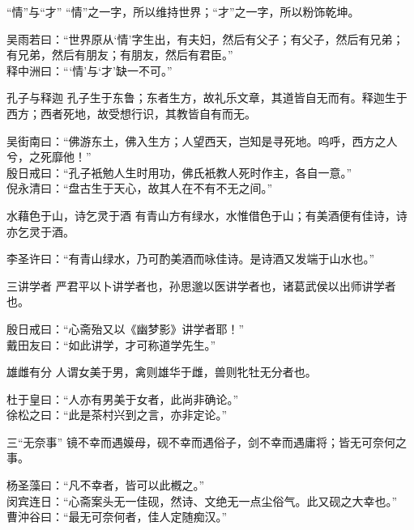 \begin{yulu}{“情”与“才”}
“情”之一字，所以维持世界；“才”之一字，所以粉饰乾坤。
\begin{comments}
吴雨若曰：“世界原从‘情’字生出，有夫妇，然后有父子；有父子，然后有兄弟；有兄弟，然后有朋友；有朋友，然后有君臣。” \\
释中洲曰：“‘情’与‘才’缺一不可。”
\end{comments}
\end{yulu}

\begin{yulu}{孔子与释迦}
孔子生于东鲁；东者生方，故礼乐文章，其道皆自无而有。释迦生于西方；西者死地，故受想行识，其教皆自有而无。
\begin{comments}
吴街南曰：“佛游东土，佛入生方；人望西天，岂知是寻死地。呜呼，西方之人兮，之死靡他！” \\
殷日戒曰：“孔子衹勉人生时用功，佛氏衹教人死时作主，各自一意。” \\
倪永清曰：“盘古生于天心，故其人在不有不无之间。”
\end{comments}
\end{yulu}

\begin{yulu}{水藉色于山，诗乞灵于酒}
有青山方有绿水，水惟借色于山；有美酒便有佳诗，诗亦乞灵于酒。
\begin{comments}
李圣许曰：“有青山绿水，乃可酌美酒而咏佳诗。是诗酒又发端于山水也。”
\end{comments}
\end{yulu}

\begin{yulu}{三讲学者}
严君平以卜讲学者也，孙思邈以医讲学者也，诸葛武侯以出师讲学者也。
\begin{comments}
殷日戒曰：“心斋殆又以《幽梦影》讲学者耶！” \\
戴田友曰：“如此讲学，才可称道学先生。”
\end{comments}
\end{yulu}

\begin{yulu}{雄雌有分}
人谓女美于男，禽则雄华于雌，兽则牝牡无分者也。
\begin{comments}
杜于皇曰：“人亦有男美于女者，此尚非确论。” \\
徐松之曰：“此是茶村兴到之言，亦非定论。”
\end{comments}
\end{yulu}

\begin{yulu}{三“无奈事”}
镜不幸而遇嫫母，砚不幸而遇俗子，剑不幸而遇庸将；皆无可奈何之事。
\begin{comments}
杨圣藻曰：“凡不幸者，皆可以此槪之。” \\
闵宾连日：“心斋案头无一佳砚，然诗、文绝无一点尘俗气。此又砚之大幸也。” \\
曹沖谷曰：“最无可奈何者，佳人定随痴汉。”
\end{comments}
\end{yulu}

